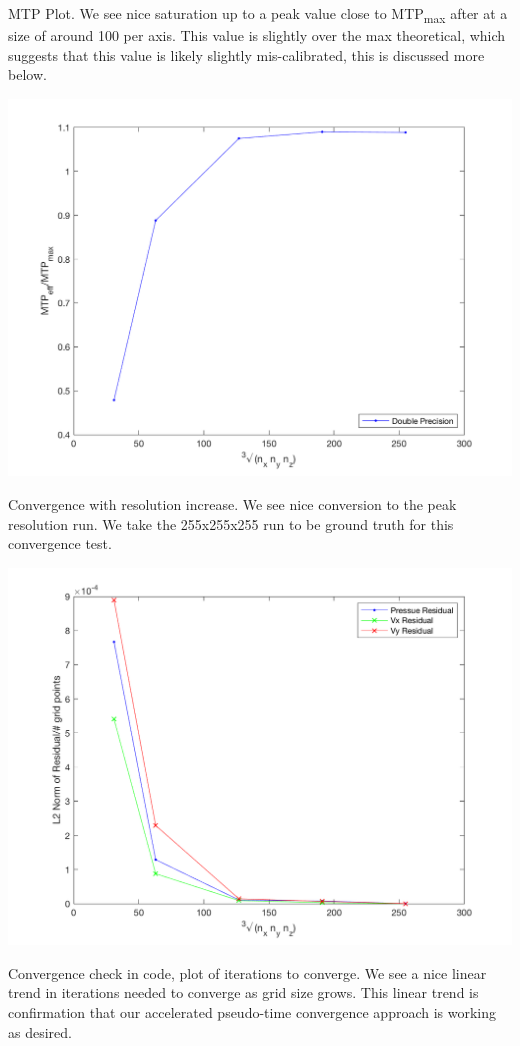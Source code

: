 MTP Plot. We see nice saturation up to a peak value close to MTP\textsubscript{max} after at a size of around 100 per axis. This value is slightly over the max theoretical, which suggests that this value is likely slightly mis-calibrated, this is discussed more below.\\
\begin{center}
	\includegraphics[width = .8\textwidth]{../3dvis/runTimes.png}
\end{center}
Convergence with resolution increase. We see nice conversion to the peak resolution run. We take the 255x255x255 run to be ground truth for this convergence test.\\
\begin{center}
	\includegraphics[width = .8\textwidth]{../3dvis/resids.png}
\end{center}
Convergence check in code, plot of iterations to converge. We see a nice linear trend in iterations needed to converge as grid size grows. This linear trend is confirmation that our accelerated pseudo-time convergence approach is working as desired.\\
